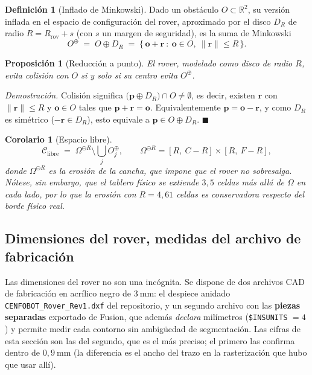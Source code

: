 \documentclass[11pt,a4paper]{article}
\newtheorem{proposicion}[teorema]{Proposición}
\newtheorem{corolario}[teorema]{Corolario}
\theoremstyle{definition}
\newtheorem{definicion}[teorema]{Definición}
\newenvironment{demo}{\par\noindent\textit{Demostración.}\;}{\hfill$\blacksquare$\par\medskip}
\newcommand{\R}{\mathbb{R}}
\newcommand{\pp}{\mathbf{p}}
\begin{document}
\begin{definicion}[Inflado de Minkowski]
Dado un obstáculo $O \subset \R^2$, su versión inflada en el espacio de configuración
del rover, aproximado por el disco $D_{R}$ de radio $R = R_{\mathrm{rov}} + s$ (con $s$
un margen de seguridad), es la suma de Minkowski
\begin{equation}
  O^{\oplus} \;=\; O \oplus D_{R} \;=\; \big\{\,\mathbf o + \mathbf r \ :\ \mathbf o\in O,\ \|\mathbf r\|\le R \,\big\}.
  \label{eq:minkowski}
\end{equation}
\end{definicion}

\begin{proposicion}[Reducción a punto]
El rover, modelado como disco de radio $R$, evita colisión con $O$ si y solo si su
centro evita $O^{\oplus}$.
\end{proposicion}

\begin{demo}
Colisión significa $\big(\pp \oplus D_R\big) \cap O \neq \emptyset$, es decir, existen
$\mathbf r$ con $\|\mathbf r\|\le R$ y $\mathbf o \in O$ tales que
$\pp + \mathbf r = \mathbf o$. Equivalentemente $\pp = \mathbf o - \mathbf r$, y como
$D_R$ es simétrico ($-\mathbf r \in D_R$), esto equivale a $\pp \in O\oplus D_R$.
\end{demo}

\begin{corolario}[Espacio libre]
\begin{equation}
  \mathcal C_{\mathrm{libre}} \;=\; \Omega^{\ominus R} \setminus \bigcup_{j} O_j^{\oplus},
  \qquad
  \Omega^{\ominus R} = [R,\ C-R]\times[R,\ F-R],
\end{equation}
donde $\Omega^{\ominus R}$ es la erosión de la cancha, que impone que el rover no
sobresalga. Nótese, sin embargo, que el tablero físico se extiende $3{,}5$ celdas más
allá de $\Omega$ en cada lado, por lo que la erosión con $R = 4{,}61$ celdas es
conservadora respecto del borde físico real.
\end{corolario}

\subsection{Dimensiones del rover, medidas del archivo de fabricación}
\label{sec:dxf}

Las dimensiones del rover no son una incógnita. Se dispone de dos archivos CAD de
fabricación en acrílico negro de $3\ \mathrm{mm}$: el despiece anidado
\texttt{CENFOBOT\_Rover\_Rev1.dxf} del repositorio, y un segundo archivo con las
\textbf{piezas separadas} exportado de Fusion, que además \emph{declara} milímetros
(\texttt{\$INSUNITS} $=4$) y permite medir cada contorno sin ambigüedad de segmentación.
Las cifras de esta sección son las del segundo, que es el más preciso; el primero las
confirma dentro de $0{,}9\ \mathrm{mm}$ (la diferencia es el ancho del trazo en la
rasterización que hubo que usar allí).
\end{document}

